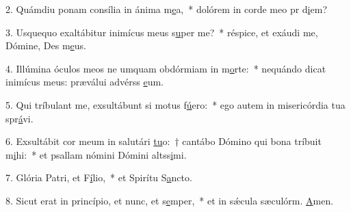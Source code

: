 2. Quámdiu ponam consília in ánima m\uline{e}a,~* dolórem in corde meo pr d\uline{i}em?\par 
3. Usquequo exaltábitur inimícus meus s\uline{u}per me?~* réspice, et exáudi me, Dómine, Des m\uline{e}us.\par 
4. Illúmina óculos meos ne umquam obdórmiam in m\uline{o}rte:~* nequándo dicat inimícus meus: præválui advérss \uline{e}um.\par 
5. Qui tríbulant me, exsultábunt si motus f\uline{ú}ero:~* ego autem in misericórdia tua spr\uline{á}vi.\par 
6. Exsultábit cor meum in salutári \uline{tu}o:~† cantábo Dómino qui bona tríbuit m\uline{i}hi:~* et psallam nómini Dómini altss\uline{i}mi.\par 
7. Glória Patri, et F\uline{í}lio,~* et Spirítu S\uline{a}ncto.\par 
8. Sicut erat in princípio, et nunc, et s\uline{e}mper,~* et in sǽcula sæculórm. \uline{A}men.\par 
